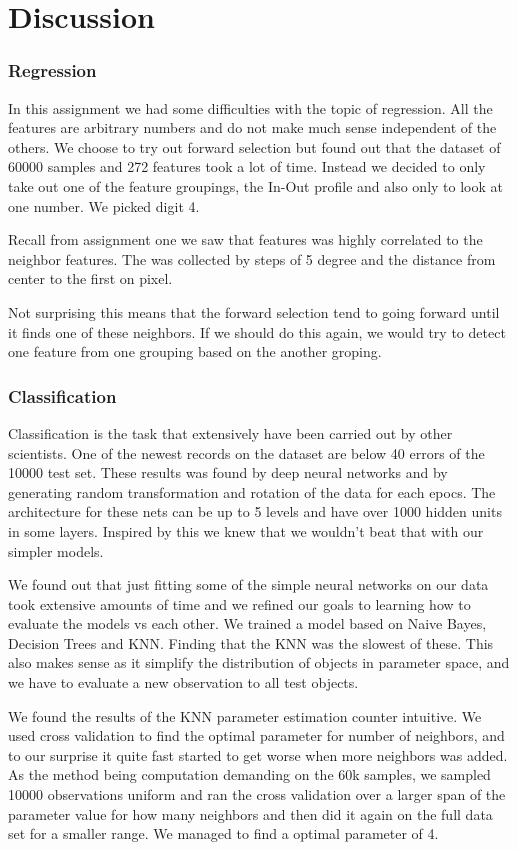 \chapter{Discussion}
\subsection{Regression}
In this assignment we had some difficulties with the topic of regression. All the features are arbitrary numbers and do not make much sense independent of the others. We choose to try out forward selection but found out that the dataset of 60000 samples and 272 features took a lot of time. Instead we decided to only take out one of the feature groupings, the In-Out profile and also only to look at one number. We picked digit 4.

Recall from assignment one we saw that features was highly correlated to the neighbor features. The was collected by steps of 5 degree and the distance from center to the first on pixel. 

Not surprising this means that the forward selection tend to going forward until it finds one of these neighbors. If we should do this again, we would try to detect one feature from one grouping based on the another groping. 

\subsection{Classification}
Classification is the task that extensively have been carried out by other scientists. One of the newest records on the dataset are below 40 errors of the 10000 test set. These results was found by deep neural networks and by generating random transformation and rotation of the data for each epocs. The architecture for these nets can be up to 5 levels and have over 1000 hidden units in some layers. Inspired by this we knew that we wouldn't beat that with our simpler models. 

We found out that just fitting some of the simple neural networks on our data took extensive amounts of time and we refined our goals to learning how to evaluate the models vs each other. We trained a model based on Naive Bayes, Decision Trees and KNN. Finding that the KNN was the slowest of these. This also makes sense as it simplify the distribution of objects in parameter space, and we have to evaluate a new observation to all test objects.

We found the results of the KNN parameter estimation counter intuitive. We used cross validation to find the optimal parameter for number of neighbors, and to our surprise it quite fast started to get worse when more neighbors was added. As the method being computation demanding on the 60k samples, we sampled 10000 observations uniform and ran the cross validation over a larger span of the parameter value for how many neighbors and then did it again on the full data set for a smaller range. We managed to find a optimal parameter of 4.

